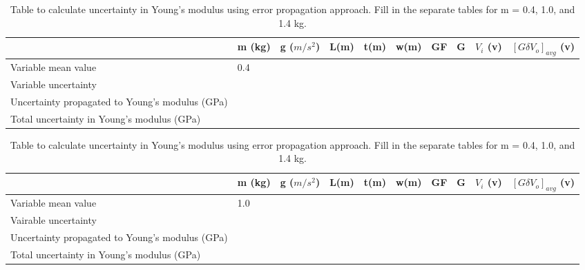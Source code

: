\documentclass{article} %
\begin{document}
\begin{table}[H]
\caption{Table to calculate uncertainty in Young's modulus using error propagation approach. Fill in the separate tables for m = 0.4, 1.0, and 1.4 kg.}
\label{tab:ErrorPropagation}
\large
\begin{tabular}{|p{5cm}| p{1cm}| p{1.1cm}| p{1cm}| p{1cm}| p{1cm}|p{1cm}| p{1cm}| p{1cm}| p{1.5cm}|}
\toprule \toprule
												& m (kg)   & g ($m/s^2$) & L(m) & t(m) & w(m)& GF & G  & $V_i$ (v) & $[G\delta V_o]_{avg}$ (v) \\ \toprule
Variable mean value   							 &     0.4 &             &      &      &     &    &    &           &                \\ \hline
Variable uncertainty                            &         &             &      &      &     &    &    &           &                \\ \hline
Uncertainty propagated to Young's modulus (GPa) &         &             &      &      &     &    &    &           &                \\ \bottomrule
Total uncertainty in Young's modulus (GPa)      & \multicolumn{8}{c}{}   & \\ \bottomrule \bottomrule
\end{tabular}

\vspace{0.2in}
\begin{tabular}{|p{5cm}| p{1cm}| p{1.1cm}| p{1cm}| p{1cm}| p{1cm}|p{1cm}| p{1cm}| p{1cm}| p{1.5cm}|}
\toprule \toprule
												& m (kg)   & g ($m/s^2$) & L(m) & t(m) & w(m)& GF & G  & $V_i$ (v) & $[G\delta V_o]_{avg}$ (v) \\ \toprule
Variable mean value   							 &     1.0 &             &      &      &     &    &    &           &                \\ \hline
Vairable uncertainty                            &         &             &      &      &     &    &    &           &                \\ \hline
Uncertainty propagated to Young's modulus (GPa) &         &             &      &      &     &    &    &           &                \\ \bottomrule
Total uncertainty in Young's modulus (GPa)      & \multicolumn{8}{c}{}   & \\ \bottomrule \bottomrule
\end{tabular}


\end{table}
\end{document}

